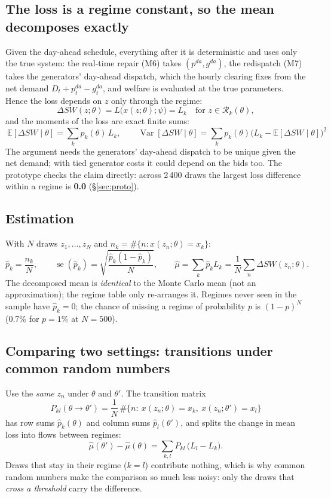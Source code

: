 \documentclass[10pt,a4paper]{article}
\newcommand{\R}{\mathcal R}
\newcommand{\E}{\mathbb E}
\begin{document}
\subsection{The loss is a regime constant, so the mean decomposes exactly}
Given the day-ahead schedule, everything after it is deterministic and uses only the true system: the
real-time repair (M6) takes $(p^{da},g^{da})$, the redispatch (M7) takes the generators' day-ahead dispatch,
which the hourly clearing fixes from the net demand $D_t+p^{da}_t-g^{da}_t$, and welfare is evaluated at the
true parameters. Hence the loss depends on $z$ only through the regime:
\[
\Delta SW(z;\theta)=L\big(x(z;\theta);\psi\big)=L_k\quad\text{for }z\in\R_k(\theta),
\]
and the moments of the loss are exact finite sums:
\[
\boxed{\ \E[\Delta SW\mid\theta]=\sum_k p_k(\theta)\,L_k,\qquad
\operatorname{Var}[\Delta SW\mid\theta]=\sum_kp_k(\theta)\big(L_k-\E[\Delta SW\mid\theta]\big)^2\ }
\]
The argument needs the generators' day-ahead dispatch to be unique given the net demand; with tied generator
costs it could depend on the bids too. The prototype checks the claim directly: across 2\,400 draws the
largest loss difference within a regime is \textbf{0.0} (\S\ref{sec:proto}).

\subsection{Estimation}
With $N$ draws $z_1,\dots,z_N$ and $n_k=\#\{n: x(z_n;\theta)=x_k\}$:
\[
\hat p_k=\frac{n_k}{N},\qquad \operatorname{se}(\hat p_k)=\sqrt{\frac{\hat p_k(1-\hat p_k)}{N}},\qquad
\hat\mu=\sum_k\hat p_kL_k=\frac1N\sum_{n}\Delta SW(z_n;\theta).
\]
The decomposed mean is \emph{identical} to the Monte Carlo mean (not an approximation); the regime table only
re-arranges it. Regimes never seen in the sample have $\hat p_k=0$; the chance of missing a regime of
probability $p$ is $(1-p)^N$ (0.7\% for $p=1\%$ at $N=500$).

\subsection{Comparing two settings: transitions under common random numbers}
Use the \emph{same} $z_n$ under $\theta$ and $\theta'$. The transition matrix
\[
P_{kl}(\theta\to\theta')=\frac1N\,\#\{n:\ x(z_n;\theta)=x_k,\ x(z_n;\theta')=x_l\}
\]
has row sums $\hat p_k(\theta)$ and column sums $\hat p_l(\theta')$, and splits the change in mean loss into
flows between regimes:
\[
\hat\mu(\theta')-\hat\mu(\theta)=\sum_{k,l}P_{kl}\,\big(L_l-L_k\big).
\]
Draws that stay in their regime ($k=l$) contribute nothing, which is why common random numbers make the
comparison so much less noisy: only the draws that \emph{cross a threshold} carry the difference.
\end{document}
